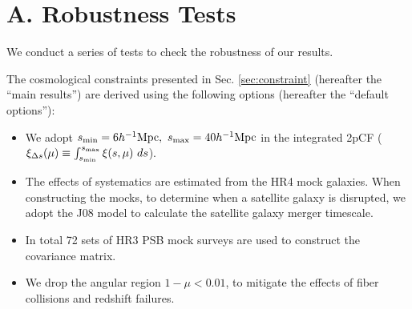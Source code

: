 \documentclass[iop]{emulateapj}
\begin{document}
\appendix

\section{A. Robustness Tests}\label{sec:RBtest}

We conduct a series of tests to check the robustness of our results.

The cosmological constraints presented in Sec. \ref{sec:constraint} (hereafter the ``main results'') are derived using 
the following options (hereafter the ``default options''):
\begin{itemize}
 \item We adopt $s_{\rm min}=6 h^{-1} {\rm Mpc},\ s_{\rm max}=40 h^{-1} {\rm Mpc}$ in the integrated 2pCF
 ($\xi_{\Delta s} (\mu) \equiv \int_{s_{\rm min}}^{s_{\rm max}} \xi (s,\mu)\ ds$).
 \item The effects of systematics are estimated from the HR4 mock galaxies. 
 When constructing the mocks, to determine when a satellite galaxy is disrupted,
 we adopt the J08 model to calculate the satellite galaxy merger timescale.
 \item In total 72 sets of HR3 PSB mock surveys are used to construct the covariance matrix.
 \item We drop the angular region $1 - \mu < 0.01$, to mitigate the effects of fiber collisions and redshift failures.
\end{itemize}
\end{document}
